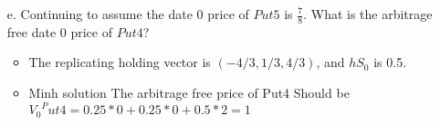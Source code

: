 \documentclass[12pt]{article}
\begin{document}
\begin{enumerate}
\begin{itemize}
\begin{comment}
  The above equation plus the characterization of martingale measures for the normalized market $(1, S^2/S^1)$ from part (a) implies $\frac{7}{4} = 1 \cdot (1 - 3q_1) + 3 \cdot (2 q_1)$, which yields $q_1 = \frac{1}{4}$ and a probability $(\frac{1}{4}, \frac{1}{4}, \frac{1}{2})$. Thus, $(S^1, S^2, Put5)$ is arbitrage free because $(\frac{1}{4}, \frac{1}{4}, \frac{1}{2})$ is the unique martingale measure of the corresponding normalized market $(1, S^2/S^1, Put5/S^1)$ with $S^1$ as numeraire.
\end{comment}
  
  
  \item[e.] Continuing to assume the date 0 price of $Put5$ is $\frac{7}{8}$. What is the arbitrage free date 0 price of $Put4$?
  \begin{itemize}
      \item The replicating holding vector is $(-4/3,1/3,4/3)$, and $hS_0$ is 0.5.
      \item Minh solution 
      The arbitrage free price of Put4 Should be\\ ${V_0}^Put4 = 0.25*0+0.25*0+0.5*2 = 1$
  \end{itemize}
 

\end{itemize}
\end{enumerate}
\end{document}
